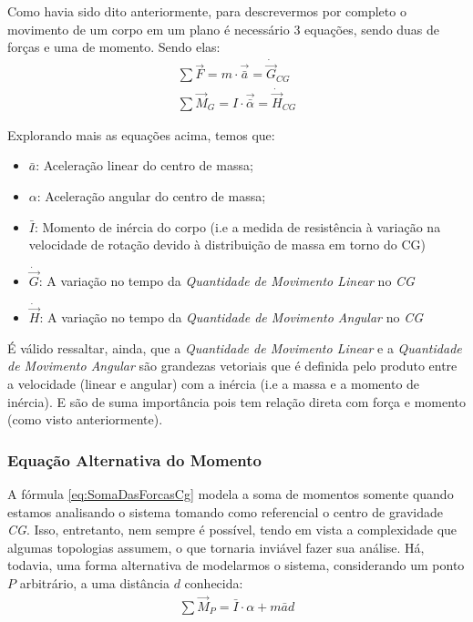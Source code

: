 \documentclass{article}
\begin{document}
Como havia sido dito anteriormente, para descrevermos por completo o movimento de um corpo em um plano é necessário 3 equações, sendo duas de forças e uma de momento. Sendo elas:
\begin{align}
    \sum \vec F = m \cdot \vec{\bar a} = \dot{\vec{G}}_{CG} \label{eq:SomaDasForcasCg} \\
    \sum \vec M_G =  I \cdot \vec{\bar\alpha} = \dot{\vec{H}}_{CG} \label{eq:soma_dos_momentos_cg}
\end{align}

Explorando mais as equações acima, temos que:
\begin{itemize}
    \item $\bar a$: Aceleração linear do centro de massa;
    \item $\alpha$: Aceleração angular do centro de massa;
    \item $\bar I$: Momento de inércia do corpo (i.e a medida de resistência à variação na velocidade de rotação devido à distribuição de massa em torno do CG)
    \item $\dot{\vec{G}}$: A variação no tempo da \emph{Quantidade de Movimento Linear} no \emph{CG}
    \item $\dot{\vec{H}}$: A variação no tempo da \emph{Quantidade de Movimento Angular} no \emph{CG}
\end{itemize}

É válido ressaltar, ainda, que a \emph{Quantidade de Movimento Linear} e a \emph{Quantidade de Movimento Angular} são grandezas vetoriais que é definida pelo produto entre a velocidade (linear e angular)
com a inércia (i.e a massa e a momento de inércia). E são de suma importância pois tem relação direta com força e momento (como visto anteriormente).


\subsubsection[Eq. Alternativa do Momento]{Equação Alternativa do Momento}

A fórmula \ref{eq:SomaDasForcasCg} modela a soma de momentos somente quando estamos analisando o sistema tomando como referencial o centro de gravidade \emph{CG}. Isso,
entretanto, nem sempre é possível, tendo em vista a complexidade que algumas topologias assumem, o que tornaria inviável fazer sua análise. Há, todavia, uma forma alternativa de
modelarmos o sistema, considerando um ponto $P$ arbitrário, a uma distância $d$ conhecida:
\begin{align}
    \sum \vec M_P = \bar I \cdot \alpha + m \bar a d \label{eq:soma_dos_momentos_ponto_p}
\end{align}
\end{document}
